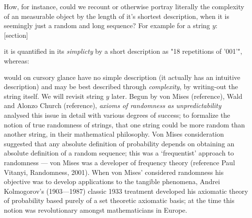 \documentclass[7pt]{article}
\begin{document}
\relax
{}\relax
\vspace{0.5cm}

 How, for instance, could we recount or otherwise portray literally the complexity of an measurable object by the length of it's shortest description, when it is seemingly just a random and long sequence? For example  for a string $y$: \\
[section]\setcounter{theo}{0}
\renewcommand{\thetheo}{\arabic{section}.\arabic{theo}}
\begin{mdframed}[tikzsetting={draw=blue,dashed,line width=0.25pt,dash pattern = on 10pt off 3pt},linecolor=white,backgroundcolor=gray!18,outerlinewidth=1pt]
\end{mdframed} it is quantified in its \textit{simplicty} by a short description as "18 repetitions of '001'", whereas:
\begin{mdframed}[tikzsetting={draw=blue,dashed,line width=0.25pt,dash pattern = on 10pt off 3pt},linecolor=white,backgroundcolor=gray!18,outerlinewidth=1pt]
	\end{mdframed} would on cursory glance have no {simple} description (it actually has an intuitive description) and may be best described through \textit{complexity},  by writing-out the string itself. We will revisit string $y$ later. Begun by von Mises (reference), Wald and Alonzo Church (reference), \textit{axioms of  randomness as unpredictability}  analysed this issue in detail with various degrees of success; to formalize the notion of true randomness of strings, that one string could be more random than another string, in their mathematical philosophy. Von Mises consideration suggested that any absolute definition of probability depends on obtaining an absolute definition of a random sequence; this was  a ‘frequentist’ approach to randomness — von Mises was a developer of frequency theory (reference Paul Vitanyi, Randomness, 2001).  When von Mises’ considered randomness his objective was to develop applications to the tangible phenomena, Andrei  Kolmogorov’s (1903—1987) classic 1933 treatment developed his
 axiomatic theory of probability based purely of a set theoretic axiomatic basis; at the time this notion was revolutionary amongst mathematicians in Europe.
\end{document}

